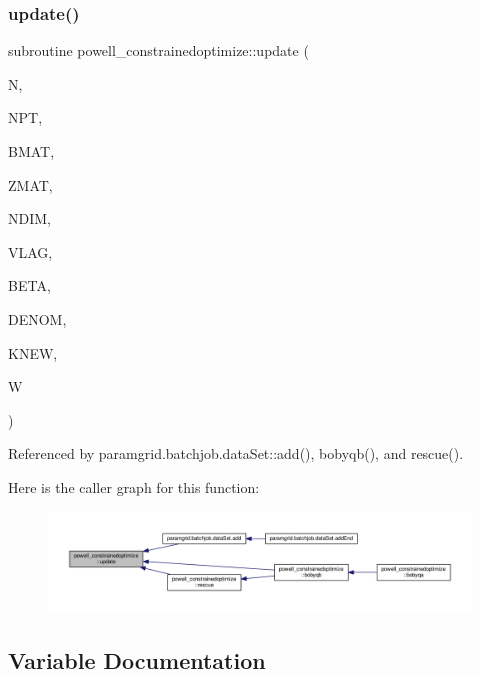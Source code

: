 \subsubsection{\texorpdfstring{update()}{update()}}
{\footnotesize\ttfamily subroutine powell\+\_\+constrainedoptimize\+::update (\begin{DoxyParamCaption}\item[{}]{N,  }\item[{}]{N\+PT,  }\item[{dimension(ndim,$\ast$)}]{B\+M\+AT,  }\item[{dimension(npt,$\ast$)}]{Z\+M\+AT,  }\item[{}]{N\+D\+IM,  }\item[{dimension($\ast$)}]{V\+L\+AG,  }\item[{}]{B\+E\+TA,  }\item[{}]{D\+E\+N\+OM,  }\item[{}]{K\+N\+EW,  }\item[{dimension($\ast$)}]{W }\end{DoxyParamCaption})\hspace{0.3cm}{\ttfamily [private]}}



Referenced by paramgrid.\+batchjob.\+data\+Set\+::add(), bobyqb(), and rescue().

Here is the caller graph for this function\+:
\nopagebreak
\begin{figure}[H]
\begin{center}
\leavevmode
\includegraphics[width=350pt]{namespacepowell__constrainedoptimize_aea17c033c10b38991c1484dfd380b3b1_icgraph}
\end{center}
\end{figure}


\subsection{Variable Documentation}
\mbox{\label{namespacepowell__constrainedoptimize_a8a0275c8eca26a533d0e5d9aef7b9eaa}} 
